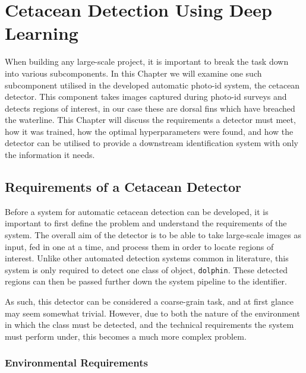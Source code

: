 \chapter{Cetacean Detection Using Deep Learning}\label{ch:cetDet}

When building any large-scale project, it is important to break the task down into various subcomponents. In this Chapter we will examine one such subcomponent utilised in the developed automatic photo-id system, the cetacean detector. This component takes images captured during photo-id surveys and detects regions of interest, in our case these are dorsal fins which have breached the waterline. This Chapter will discuss the requirements a detector must meet, how it was trained, how the optimal hyperparameters were found, and how the detector can be utilised to provide a downstream identification system with only the information it needs. 

\section{Requirements of a Cetacean Detector}\label{ch:cetDet,sec:requirements}

Before a system for automatic cetacean detection can be developed, it is important to first define the problem and understand the requirements of the system. The overall aim of the detector is to be able to take large-scale images as input, fed in one at a time, and process them in order to locate regions of interest. Unlike other automated detection systems common in literature, this system is only required to detect one class of object, \texttt{dolphin}. These detected regions can then be passed further down the system pipeline to the identifier. 

 As such, this detector can be considered a coarse-grain task, and at first glance may seem somewhat trivial. However, due to both the nature of the environment in which the class must be detected, and the technical requirements the system must perform under, this becomes a much more complex problem. 
 
 \subsection{Environmental Requirements}\label{ch:cetDet,sec:requirements,sub:environmental}
 
